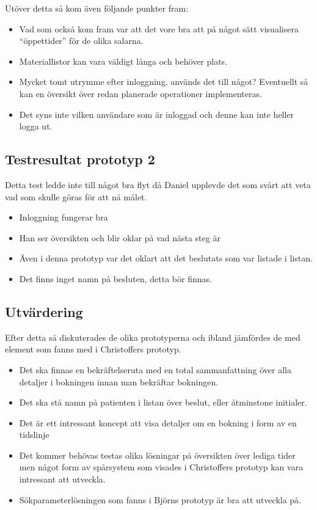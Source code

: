 \documentclass[a4paper,10pt, twoside]{article}
\begin{document}
Utöver detta så kom även följande punkter fram:
\begin{itemize}
\item Vad som också kom fram var att det vore bra att på något sätt visualisera “öppettider” för de olika salarna.
\item Materiallistor kan vara väldigt långa och behöver plats.
\item Mycket tomt utrymme efter inloggning, används det till något? Eventuellt så kan en översikt över redan planerade operationer implementeras.
\item Det syns inte vilken användare som är inloggad och denne kan inte heller logga ut.
\end{itemize}
\subsection{Testresultat prototyp 2}
Detta test ledde inte till något bra flyt då Daniel upplevde det som svårt att veta vad som skulle göras för att nå målet.
\begin{itemize}
\item Inloggning fungerar bra
\item Han ser översikten och blir oklar på vad nästa steg är
\item Även i denna prototyp var det oklart att det beslutats som var listade i listan.
\item Det finns inget namn på besluten, detta bör finnas.
\end{itemize}

\subsection{Utvärdering}
Efter detta så diskuterades de olika prototyperna och ibland jämfördes de med element som fanns med i Christoffers prototyp.

\begin{itemize}
\item Det ska finnas en bekräftelseruta med en total sammanfattning över alla detaljer i bokningen innan man bekräftar bokningen.
\item Det ska stå namn på patienten i listan över beslut, eller åtminstone initialer.
\item Det är ett intressant koncept att visa detaljer om en bokning i form av en tidslinje
\item Det kommer behövas testas olika lösningar på översikten över lediga tider men något form av spårsystem som visades i Christoffers prototyp kan vara intressant att utveckla.
\item Sökparameterlösningen som fanns i Björns prototyp är bra att utveckla på.
\end{itemize}
\end{document}
